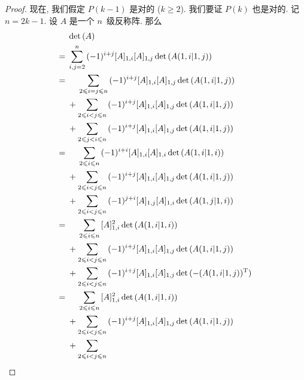 \documentclass[../libro.tex]{subfiles}
\begin{document}
\begin{proof}
    现在, 我们假定 \(P(k-1)\) 是对的 (\(k \geq 2\)).
    我们要证 \(P(k)\) 也是对的.
    记 \(n = 2k-1\).
    设 \(A\) 是一个 \(n\)~级反称阵.
    那么
    \begin{align*}
        & \det {(A)}     \\
        = {} &
        \sum_{i, j = 2}^{n} {
            (-1)^{i+j}
            [A]_{1,i} [A]_{1,j} \det {(A(1,i|1,j))}
        }
        \\
        = {} &
        \hphantom{{} + {}}
        \sum_{2 \leq i = j \leq n} {
            (-1)^{i+j}
            [A]_{1,i} [A]_{1,j} \det {(A(1,i|1,j))}
        }
        \\
        & +
        \sum_{2 \leq i < j \leq n} {
            (-1)^{i+j}
            [A]_{1,i} [A]_{1,j} \det {(A(1,i|1,j))}
        }
        \\
        & +
        \sum_{2 \leq j < i \leq n} {
            (-1)^{i+j}
            [A]_{1,i} [A]_{1,j} \det {(A(1,i|1,j))}
        }
        \\
        = {} &
        \hphantom{{} + {}}
        \sum_{2 \leq i \leq n} {
            (-1)^{i+i}
            [A]_{1,i} [A]_{1,i} \det {(A(1,i|1,i))}
        }
        \\
        & +
        \sum_{2 \leq i < j \leq n} {
            (-1)^{i+j}
            [A]_{1,i} [A]_{1,j} \det {(A(1,i|1,j))}
        }
        \\
        & +
        \sum_{2 \leq i < j \leq n} {
            (-1)^{j+i}
            [A]_{1,j} [A]_{1,i} \det {(A(1,j|1,i))}
        }
        \\
        = {} &
        \hphantom{{} + {}}
        \sum_{2 \leq i \leq n} {
            [A]_{1,i}^2 \det {(A(1,i|1,i))}
        }
        \\
        & +
        \sum_{2 \leq i < j \leq n} {
            (-1)^{i+j}
            [A]_{1,i} [A]_{1,j} \det {(A(1,i|1,j))}
        }
        \\
        & +
        \sum_{2 \leq i < j \leq n} {
            (-1)^{i+j}
            [A]_{1,i} [A]_{1,j}
            \det {(-(A(1,i|1,j))^{\mathrm{T}})}
        }
        \\
        = {} &
        \hphantom{{} + {}}
        \sum_{2 \leq i \leq n} {
            [A]_{1,i}^2 \det {(A(1,i|1,i))}
        }
        \\
        & +
        \sum_{2 \leq i < j \leq n} {
            (-1)^{i+j}
            [A]_{1,i} [A]_{1,j} \det {(A(1,i|1,j))}
        }
        \\
        & +
        \sum_{2 \leq i < j \leq n} {
}
\end{align*}
\end{proof}
\end{document}
